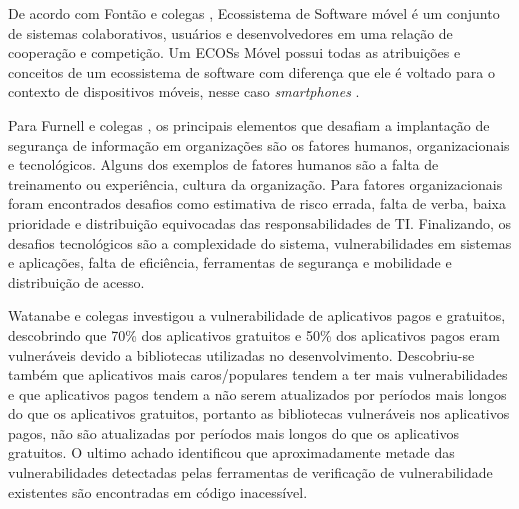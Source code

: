 De acordo com Fontão e colegas \cite{fontao}, Ecossistema de Software móvel é um conjunto de sistemas colaborativos, usuários e desenvolvedores em uma relação de cooperação e competição. Um ECOSs Móvel possui todas as atribuições e conceitos de um ecossistema de software com diferença que ele é voltado para o contexto de dispositivos móveis, nesse caso \textit{smartphones} \cite{mestradoCaio}.

Para Furnell e colegas \cite{furnell2009integrated}, os principais elementos que desafiam a implantação de segurança de informação em organizações são os fatores humanos, organizacionais e tecnológicos. Alguns dos exemplos de fatores humanos são a falta de treinamento ou experiência, cultura da organização. Para fatores organizacionais foram encontrados desafios como estimativa de risco errada, falta de verba, baixa prioridade e distribuição equivocadas das responsabilidades de TI. Finalizando, os desafios tecnológicos são a complexidade do sistema, vulnerabilidades em sistemas e aplicações, falta de eficiência, ferramentas de segurança e mobilidade e distribuição de acesso.

Watanabe e colegas \cite{watanabe2017understanding} investigou a vulnerabilidade de aplicativos pagos e gratuitos, descobrindo que 70{\%} dos aplicativos gratuitos e 50{\%} dos aplicativos pagos eram vulneráveis devido a bibliotecas utilizadas no desenvolvimento. Descobriu-se também que aplicativos mais caros/populares tendem a ter mais vulnerabilidades e que aplicativos pagos tendem a não serem atualizados por períodos mais longos do que os aplicativos gratuitos, portanto as bibliotecas vulneráveis nos aplicativos pagos, não são atualizadas por períodos mais longos do que os aplicativos gratuitos.  O ultimo achado identificou que aproximadamente metade das vulnerabilidades detectadas pelas ferramentas de verificação de vulnerabilidade existentes são encontradas em código inacessível.

